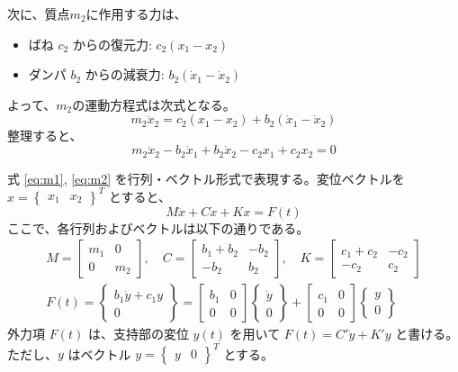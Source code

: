 \documentclass[dvipdfmx,a4paper]{jsarticle}
\begin{document}
次に、質点$m_2$に作用する力は、
\begin{itemize}
    \item ばね $c_2$ からの復元力: $c_2 (x_1 - x_2)$
    \item ダンパ $b_2$ からの減衰力: $b_2 (\dot{x}_1 - \dot{x}_2)$
\end{itemize}
よって、$m_2$の運動方程式は次式となる。
\begin{equation}
    m_2 \ddot{x}_2 = c_2 (x_1 - x_2) + b_2 (\dot{x}_1 - \dot{x}_2)
\end{equation}
整理すると、
\begin{equation}
    m_2 \ddot{x}_2 - b_2 \dot{x}_1 + b_2 \dot{x}_2 - c_2 x_1 + c_2 x_2 = 0 \label{eq:m2}
\end{equation}

式 \eqref{eq:m1}, \eqref{eq:m2} を行列・ベクトル形式で表現する。変位ベクトルを $x = \begin{Bmatrix} x_1 & x_2 \end{Bmatrix}^T$ とすると、
\begin{equation}
    M \ddot{x} + C \dot{x} + K x = F(t)
\end{equation}
ここで、各行列およびベクトルは以下の通りである。
\begin{gather}
    M = \begin{bmatrix} m_1 & 0 \\ 0 & m_2 \end{bmatrix}, \quad
    C = \begin{bmatrix} b_1+b_2 & -b_2 \\ -b_2 & b_2 \end{bmatrix}, \quad
    K = \begin{bmatrix} c_1+c_2 & -c_2 \\ -c_2 & c_2 \end{bmatrix} \\
    F(t) = \begin{Bmatrix} b_1 \dot{y} + c_1 y \\ 0 \end{Bmatrix} = \begin{bmatrix} b_1 & 0 \\ 0 & 0 \end{bmatrix} \begin{Bmatrix} \dot{y} \\ 0 \end{Bmatrix} + \begin{bmatrix} c_1 & 0 \\ 0 & 0 \end{bmatrix} \begin{Bmatrix} y \\ 0 \end{Bmatrix}
\end{gather}
外力項 $F(t)$ は、支持部の変位 $y(t)$ を用いて $F(t) = C' \dot{y} + K' y$ と書ける。ただし、$y$ はベクトル $y=\begin{Bmatrix}y & 0\end{Bmatrix}^T$ とする。
\end{document}
